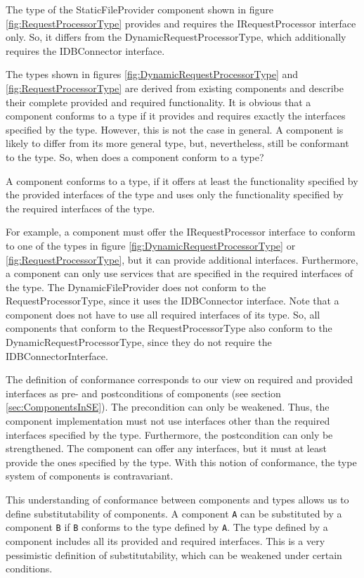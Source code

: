 The type of the StaticFileProvider component shown in figure
\ref{fig:RequestProcessorType} provides and requires the IRequestProcessor
interface only. So, it differs from the DynamicRequestProcessorType, which
additionally requires the IDBConnector interface. 

The types shown in figures \ref{fig:DynamicRequestProcessorType} and
\ref{fig:RequestProcessorType} are derived from existing components and describe
their complete provided and required functionality.
It is obvious that a component conforms to a type if it provides and requires
exactly the interfaces specified by the type. However, this is not the case in
general. A component is likely to differ from its more general type, but,
nevertheless, still be conformant to the type. So, when does a component conform
to a type?

A component conforms to a type, if it offers at least the functionality
specified by the provided interfaces of the type and uses only the functionality
specified by the required interfaces of the type.

For example, a component must offer the IRequestProcessor interface to conform
to one of the types in figure \ref{fig:DynamicRequestProcessorType} or
\ref{fig:RequestProcessorType}, but it can provide additional interfaces.
Furthermore, a component can only use services that are specified in the
required interfaces of the type. The DynamicFileProvider does not conform to the
RequestProcessorType, since it uses the IDBConnector interface. Note that a
component does not have to use all required interfaces of its type. So, all
components that conform to the RequestProcessorType also conform to the
DynamicRequestProcessorType, since they do not require the
IDBConnectorInterface. 

The definition of conformance corresponds to our view on required and provided
interfaces as pre- and postconditions of components (see section
\ref{sec:ComponentsInSE}). The precondition can only be weakened. Thus, the
component implementation must not use interfaces other than the required
interfaces specified by the type. Furthermore, the postcondition can only be
strengthened. The component can offer any interfaces, but it must at least
provide the ones specified by the type. With this notion of conformance, the
type system of components is contravariant.

This understanding of conformance between components and types allows us to
define substitutability of components. A component \texttt{A} can be substituted
by a component \texttt{B} if \texttt{B} conforms to the type defined by
\texttt{A}. The type defined by a component includes all its provided and
required interfaces. This is a very pessimistic definition of substitutability,
which can be weakened under certain conditions. 

